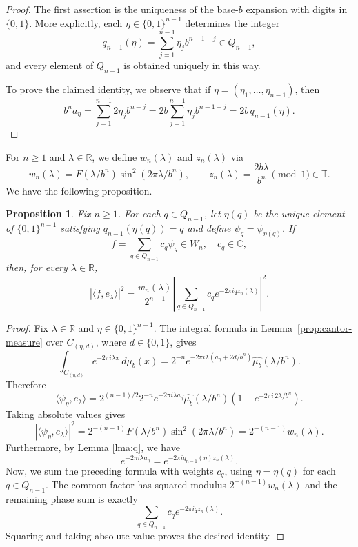 \documentclass[reqno,a4paper,12pt]{amsart}
\newtheorem{proposition}[definition]{Proposition}
\def\R{{\mathbb R}}
\def\T{{\mathbb T}}
\def\C{{\mathbb C}}
\begin{document}
\begin{proof}
The first assertion is the uniqueness of the base-$b$ expansion with digits in
$\{0,1\}$. More explicitly, each $\eta\in\{0,1\}^{n-1}$ determines the
integer
$$
        q_{n-1}(\eta)=\sum_{j=1}^{n-1}\eta_jb^{n-1-j}\in Q_{n-1},
$$
and every element of $Q_{n-1}$ is obtained uniquely in this way.

To prove the claimed identity, we observe that if $\eta=(\eta_1,\ldots,\eta_{n-1})$, then
$$
        b^n a_\eta
        =
        \sum_{j=1}^{n-1}2\eta_j b^{n-j}
        =
        2b\sum_{j=1}^{n-1}\eta_j b^{n-1-j}
        =
        2b\,q_{n-1}(\eta).
$$
\end{proof}
For $n\ge1$ and $\lambda\in\R$, we define $w_n(\lambda)$ and $z_n(\lambda)$ via
$$
        w_n(\lambda)
        =
        F(\lambda/b^n)\sin^2(2\pi\lambda/b^n),
        \qquad
        z_n(\lambda)=\frac{2b\lambda}{b^n}\pmod1\in\T.
$$
We have the following proposition.
\begin{proposition}
\label{prop:haar-coefficient-identity}
Fix $n\ge1$. For each $q\in Q_{n-1}$, let $\eta(q)$ be the unique
element of $\{0,1\}^{n-1}$ satisfying $q_{n-1}(\eta(q))=q$ and define
$\psi_q=\psi_{\eta(q)}$. If
$$
        f=\sum_{q\in Q_{n-1}}c_q\psi_q\in W_n, \quad c_q \in \C,
$$
then, for every $\lambda\in\R$,
\begin{equation}\label{eq:coefficient-identity}
        |\langle f,e_\lambda\rangle|^2
        =
        \frac{w_n(\lambda)}{2^{n-1}}
        \left|
        \sum_{q\in Q_{n-1}}c_qe^{-2\pi iqz_n(\lambda)}
        \right|^2.
\end{equation}
\end{proposition}

\begin{proof}
Fix $\lambda\in\R$ and $\eta\in\{0,1\}^{n-1}$. The integral formula in Lemma~\ref{prop:cantor-measure}
over $C_{(\eta,d)}$, where $d\in\{0,1\}$, gives
$$
        \int_{C_{(\eta,d)}}e^{-2\pi i\lambda x}\,d\mu_b(x)
        =
        2^{-n}
        e^{-2\pi i\lambda(a_\eta+2d/b^n)}
        \widehat{\mu_b}(\lambda/b^n).
$$
Therefore
$$
        \langle\psi_\eta,e_\lambda\rangle
        =
        2^{(n-1)/2}2^{-n}
        e^{-2\pi i\lambda a_\eta}
        \widehat{\mu_b}(\lambda/b^n)
        \left(1-e^{-2\pi i\,2\lambda/b^n}\right).
$$
Taking absolute values gives
$$
        |\langle\psi_\eta,e_\lambda\rangle|^2
        =
        2^{-(n-1)}
        F(\lambda/b^n)\sin^2(2\pi\lambda/b^n)
        =
        2^{-(n-1)}w_n(\lambda).
$$
Furthermore, by Lemma \ref{lma:q}, we have
$$
        e^{-2\pi i\lambda a_\eta}
        =
        e^{-2\pi i q_{n-1}(\eta)z_n(\lambda)}.
$$
Now, we sum the preceding formula with weights $c_q$,
using $\eta=\eta(q)$ for each $q\in Q_{n-1}$. The common factor has
squared modulus $2^{-(n-1)}w_n(\lambda)$ and the remaining phase sum is
exactly
$$
        \sum_{q\in Q_{n-1}}c_qe^{-2\pi iqz_n(\lambda)}.
$$
Squaring and taking absolute value proves the desired identity.
\end{proof}
\end{document}
